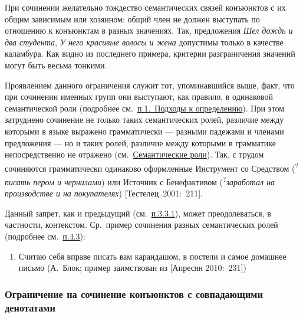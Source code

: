 При сочинении желательно тождество семантических связей конъюнктов с их
общим зависимым или хозяином: общий член не должен выступать по
отношению к конъюнктам в разных значениях. Так, предложения \textit{Шел
дождь и два студента}, \textit{У него красивые волосы и жена} допустимы
только в качестве каламбура. Как видно из последнего примера, критерии
разграничения значений могут быть весьма тонкими.

Проявлением данного ограничения служит тот, упоминавшийся выше, факт,
что при сочинении именных групп они выступают, как правило, в одинаковой
семантической роли (подробнее см.~\underline{п.1.~Подходы к
определению}). При этом затруднено сочинение не только таких
семантических ролей, различие между которыми в языке выражено
грамматически --- разными падежами и членами предложения --- но и таких
ролей, различие между которыми в грамматике непосредственно не отражено
(см.~\underline{Семантические роли}). Так, с трудом сочиняются
грамматически одинаково оформленные Инструмент со Средством
(\textsuperscript{?}\textit{писать пером и чернилами}) или Источник с
Бенефактивом (\textsuperscript{?}\textit{заработал на производстве и на
покупателях}) {[}Тестелец~2001:~211{]}.

Данный запрет, как и предыдущий (см.~\underline{п.3.3.1}), может
преодолеваться, в частности, контекстом. Ср.~пример сочинения разных
семантических ролей (подробнее см.~\underline{п.4.3}):

\begin{enumerate}
\def\labelenumi{(\arabic{enumi})}
\setcounter{enumi}{16}
\item
  Считаю себя вправе писать вам карандашом, в постели и самое домашнее
  письмо (А.~Блок; пример заимствован из {[}Апресян 2010:~231{]})
\end{enumerate}

\subsubsection{Ограничение на сочинение конъюнктов с совпадающими
денотатами}\label{ux43eux433ux440ux430ux43dux438ux447ux435ux43dux438ux435-ux43dux430-ux441ux43eux447ux438ux43dux435ux43dux438ux435-ux43aux43eux43dux44aux44eux43dux43aux442ux43eux432-ux441-ux441ux43eux432ux43fux430ux434ux430ux44eux449ux438ux43cux438-ux434ux435ux43dux43eux442ux430ux442ux430ux43cux438}

